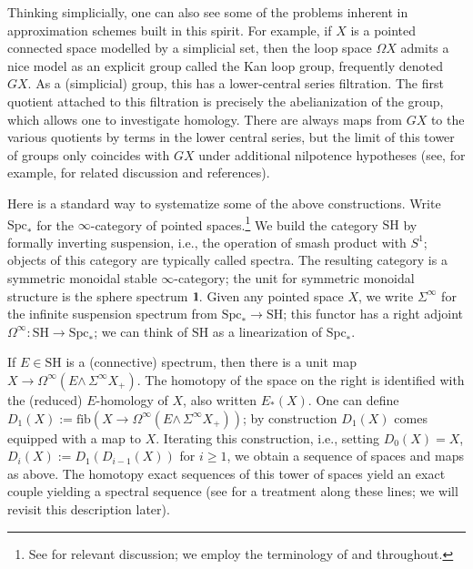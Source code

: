 \documentclass[11pt,leqno]{article}
\newcommand{\sma}{{\scriptstyle{\wedge}\,}}
\renewcommand{\1}{{\rm 1\hspace*{-0.4ex}%
\rule{0.1ex}{1.52ex}\hspace*{0.2ex}}}
\newcommand{\SH}{{\mathrm{SH}}}
\newcommand{\Spc}{\mathrm{Spc}}
\newcommand{\<}[1]{{\langle}#1 {\rangle}}
\newcommand{\fib}{\mathrm{fib}}
\theoremstyle{plain}
\theoremstyle{definition}
\theoremstyle{remark}
\numberwithin{equation}{subsection}
\begin{document}
Thinking simplicially, one can also see some of the problems inherent in approximation schemes built in this spirit.  For example, if $X$ is a pointed connected space modelled by a simplicial set, then the loop space $\Omega X$ admits a nice model as an explicit group called the Kan loop group, frequently denoted $GX$.  As a (simplicial) group, this has a lower-central series filtration.  The first quotient attached to this filtration is precisely the abelianization of the group, which allows one to investigate homology.   There are always maps from $GX$ to the various quotients by terms in the lower central series, but the limit of this tower of groups only coincides with $GX$ under additional nilpotence hypotheses (see, for example, \cite{Rector1966,BousfieldEtAl1966, BousfieldCurtis1970, BousfieldKan1972} for related discussion and references).  

Here is a standard way to systematize some of the above constructions.  Write $\Spc_*$ for the $\infty$-category of pointed spaces.\footnote{See \cite[\S 1.2.16]{LurieHTT} for relevant discussion; we employ the terminology of \cite{LurieHTT} and \cite{LurieHA} throughout.}  We build the category $\SH$ by formally inverting suspension, i.e., the operation of smash product with $S^1$; objects of this category are typically called spectra.  The resulting category is a symmetric monoidal stable $\infty$-category; the unit for symmetric monoidal structure is the sphere spectrum $\1$.  Given any pointed space $X$, we write $\Sigma^{\infty}$ for the infinite suspension spectrum from $\Spc_* \to \SH$; this functor has a right adjoint $\Omega^{\infty}: \SH \to \Spc_*$; we can think of $\SH$ as a linearization of $\Spc_*$.  

If $E \in \SH$ is a (connective) spectrum, then there is a unit map $X \to \Omega^{\infty}(E \sma \Sigma^{\infty}X_+)$.  The homotopy of the space on the right is identified with the (reduced) $E$-homology of $X$,  also written $E_*(X)$.  One can define $D_1(X) := \fib(X \to \Omega^{\infty}(E \sma \Sigma^{\infty} X_+))$; by construction $D_1(X)$ comes equipped with a map to $X$.  Iterating this construction, i.e., setting $D_0(X) = X$, $D_i(X) := D_1(D_{i-1}(X))$ for $i \geq 1$, we obtain a sequence of spaces and maps as above.  The homotopy exact sequences of this tower of spaces yield an exact couple yielding a spectral sequence (see \cite{BenderskyCurtisMiller1978} for a treatment along these lines; we will revisit this description later).  
\end{document}
